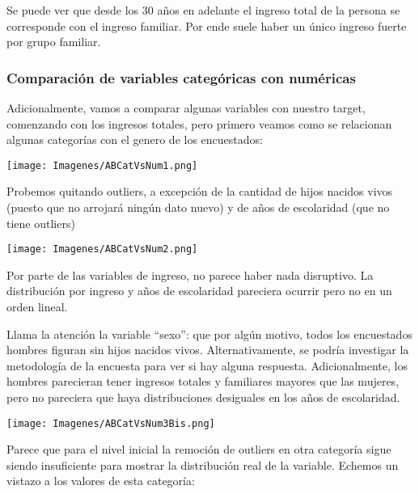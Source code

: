 \documentclass[a4paper]{article}
\begin{document}
            Se puede ver que desde los 30 años en adelante el ingreso total de la persona se corresponde con el ingreso familiar. Por ende suele haber un único ingreso fuerte por grupo familiar.
 
        \subsubsection{Comparación de variables categóricas con numéricas}
 
            Adicionalmente, vamos a comparar algunas variables con nuestro target, comenzando con los ingresos totales, pero primero veamos como se relacionan algunas categorías con el genero de los encuestados:
 
            \begin{center}
                \texttt{[image: Imagenes/ABCatVsNum1.png]}
            \end{center}
 
            Probemos quitando outliers, a excepción de la cantidad de hijos nacidos vivos (puesto que no arrojará ningún dato nuevo) y de años de escolaridad (que no tiene outliers)
 
            \begin{center}
                \texttt{[image: Imagenes/ABCatVsNum2.png]}
            \end{center}
 
            Por parte de las variables de ingreso, no parece haber nada disruptivo. La distribución por ingreso y años de escolaridad pareciera ocurrir pero no en un orden lineal.
 
            Llama la atención la variable ``sexo'': que por algún motivo, todos los encuestados hombres figuran sin hijos nacidos vivos. Alternativamente, se podría investigar la metodología de la encuesta para ver si hay alguna respuesta. Adicionalmente, los hombres parecieran tener ingresos totales y familiares mayores que las mujeres, pero no pareciera que haya distribuciones desiguales en los años de escolaridad.
 
            \begin{center}
                \texttt{[image: Imagenes/ABCatVsNum3Bis.png]}
            \end{center}
 
            Parece que para el nivel inicial la remoción de outliers en otra categoría sigue siendo insuficiente para mostrar la distribución real de la variable. Echemos un vistazo a los valores de esta categoría:
 
\end{document}
